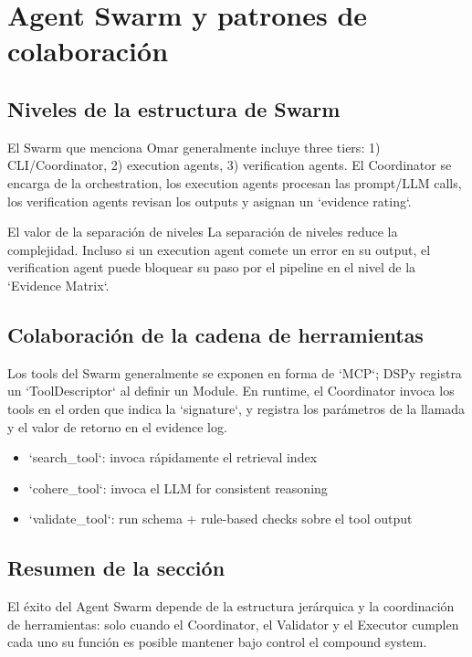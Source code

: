 \section{Agent Swarm y patrones de colaboración}

\subsection{Niveles de la estructura de Swarm}

El Swarm que menciona Omar generalmente incluye three tiers: 1) CLI/Coordinator, 2) execution agents, 3) verification agents. El Coordinator se encarga de la orchestration, los execution agents procesan las prompt/LLM calls, los verification agents revisan los outputs y asignan un `evidence rating`.

\begin{importantbox}{El valor de la separación de niveles}
La separación de niveles reduce la complejidad. Incluso si un execution agent comete un error en su output, el verification agent puede bloquear su paso por el pipeline en el nivel de la `Evidence Matrix`.
\end{importantbox}

\subsection{Colaboración de la cadena de herramientas}

Los tools del Swarm generalmente se exponen en forma de `MCP`; DSPy registra un `ToolDescriptor` al definir un Module. En runtime, el Coordinator invoca los tools en el orden que indica la `signature`, y registra los parámetros de la llamada y el valor de retorno en el evidence log.

\begin{itemize}
    \item `search\_tool`: invoca rápidamente el retrieval index
    \item `cohere\_tool`: invoca el LLM for consistent reasoning
    \item `validate\_tool`: run schema + rule-based checks sobre el tool output
\end{itemize}

\subsection{Resumen de la sección}

El éxito del Agent Swarm depende de la estructura jerárquica y la coordinación de herramientas: solo cuando el Coordinator, el Validator y el Executor cumplen cada uno su función es posible mantener bajo control el compound system.

